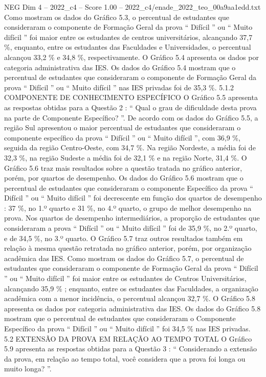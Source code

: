 \begin{textsample}{NEG Dim 4 – 2022\_c4 – Score 1.00 – 2022\_c4/enade\_2022\_teo\_00a9aa1edd.txt}
Como mostram os dados do Gráfico 5.3, o percentual de estudantes que consideraram o componente de Formação Geral da prova “ Difícil ” ou “ Muito difícil ” foi maior entre os estudantes de centros universitários, alcançando 37,7 \%, enquanto, entre os estudantes das Faculdades e Universidades, o percentual alcançou 33,2 \% e 34,8 \%, respectivamente.
O Gráfico 5.4 apresenta os dados por categoria administrativa das IES.
Os dados do Gráfico 5.4 mostram que o percentual de estudantes que consideraram o componente de Formação Geral da prova “ Difícil ” ou “ Muito difícil ” nas IES privadas foi de 35,3 \%. 5.1.2 COMPONENTE DE CONHECIMENTO ESPECÍFICO O Gráfico 5.5 apresenta as respostas obtidas para a Questão 2 : “ Qual o grau de dificuldade desta prova na parte de Componente Específico? ”.
De acordo com os dados do Gráfico 5.5, a região Sul apresentou o maior percentual de estudantes que consideraram o componente específico da prova “ Difícil ” ou “ Muito difícil ”, com 36,9 \%, seguida da região Centro-Oeste, com 34,7 \%.
Na região Nordeste, a média foi de 32,3 \%, na região Sudeste a média foi de 32,1 \% e na região Norte, 31,4 \%.
O Gráfico 5.6 traz mais resultados sobre a questão tratada no gráfico anterior, porém, por quartos de desempenho.
Os dados do Gráfico 5.6 mostram que o percentual de estudantes que consideraram o componente Específico da prova “ Difícil ” ou “ Muito difícil ” foi decrescente em função dos quartos de desempenho : 37 \%, no 1.º quarto e 31 \%, no 4.º quarto, o grupo de melhor desempenho na prova.
Nos quartos de desempenho intermediários, a proporção de estudantes que consideraram a prova “ Difícil ” ou “ Muito difícil ” foi de 35,9 \%, no 2.º quarto, e de 34,5 \%, no 3.º quarto.
O Gráfico 5.7 traz outros resultados também em relação à mesma questão retratada no gráfico anterior, porém, por organização acadêmica das IES.
Como mostram os dados do Gráfico 5.7, o percentual de estudantes que consideraram o componente de Formação Geral da prova “ Difícil ” ou “ Muito difícil ” foi maior entre os estudantes de Centros Universitários, alcançando 35,9 \% ; enquanto, entre os estudantes das Faculdades, a organização acadêmica com a menor incidência, o percentual alcançou 32,7 \%.
O Gráfico 5.8 apresenta os dados por categoria administrativa das IES.
Os dados do Gráfico 5.8 mostram que o percentual de estudantes que consideraram o Componente Específico da prova “ Difícil ” ou “ Muito difícil ” foi 34,5 \% nas IES privadas. 5.2 EXTENSÃO DA PROVA EM RELAÇÃO AO TEMPO TOTAL O Gráfico 5.9 apresenta as respostas obtidas para a Questão 3 : “ Considerando a extensão da prova, em relação ao tempo total, você considera que a prova foi longa ou muito longa? ”.

\end{textsample}
